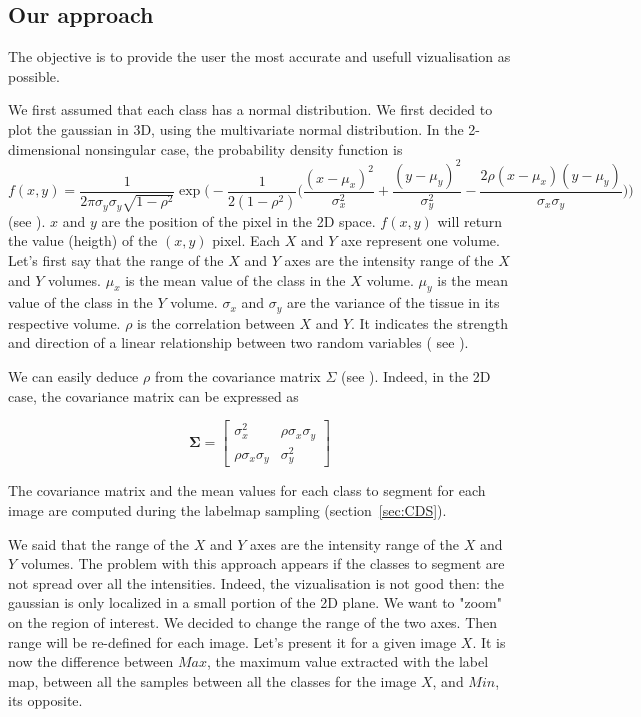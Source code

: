 \subsection{Our approach}
The objective is to provide the user the most accurate and usefull vizualisation as possible.
\par
We first assumed that each class has a normal distribution. We first decided to plot the gaussian in 3D, using the multivariate normal distribution.
In the 2-dimensional nonsingular case, the probability density function is 
\begin{equation*}
f(x,y)=\frac{1}{2 \pi \sigma_y \sigma_y \sqrt{1-\rho^2}} \operatorname*{exp}\Big ( -\frac{1}{2(1-\rho^2)}\Big( \frac{(x-\mu_x)^2}{\sigma_x^2} + \frac{(y-\mu_y)^2}{\sigma_y^2} - \frac{2\rho(x-\mu_x)(y-\mu_y)}{\sigma_x \sigma_y}\Big)\Big)   
\end{equation*}
(see \cite{15}). $x$ and $y$ are the position of the pixel in the 2D space. $f(x,y)$ will return the value (heigth) of the $(x,y)$ pixel. Each $X$ and  $Y$ axe represent one volume. Let's first say that the range of the $X$ and $Y$ axes are the intensity range of the $X$ and $Y$ volumes. $\mu_x$ is the mean value of the class in the $X$ volume. $\mu_y$ is the mean value of the class in the $Y$ volume. $\sigma_x$ and  $\sigma_y$ are the variance of the tissue in its respective volume. $\rho$ is the correlation between $X$ and $Y$. It indicates the strength and direction of a linear relationship between two random variables ( see \cite{16}). 
\par
We can easily deduce $\rho$ from the covariance matrix $\Sigma$ (see \cite{17}). Indeed, in the 2D case, the covariance matrix can be expressed as

\begin{equation*}
\mathbf{\Sigma} = 
 \begin{bmatrix}
   \sigma_x^2 & \rho \sigma_x \sigma_y \\
   \rho \sigma_x \sigma_y & \sigma_y^2
 \end{bmatrix}
\end{equation*}

The covariance matrix and the mean values for each class to segment for each image are computed during the labelmap sampling (section~\ref{sec:CDS}).
\par
We said that the range of the $X$ and $Y$ axes are the intensity range of the $X$ and $Y$ volumes. The problem with this approach appears if the classes to segment are not spread over all the intensities. Indeed, the vizualisation is not good then: the gaussian is only localized in a small portion of the 2D plane. We want to "zoom" on the region of interest. We decided to change the range of the two axes. Then range will be re-defined for each image. Let's present it for a given image $X$. It is now the difference between $Max$, the maximum value extracted with the label map, between all the samples between all the classes for the image $X$, and $Min$, its opposite.

